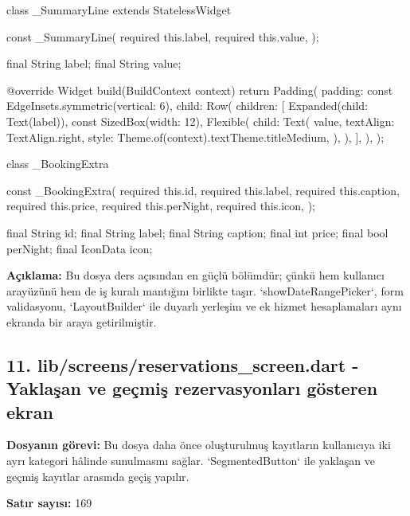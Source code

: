 \documentclass[11pt,a4paper]{article}
\begin{document}
\begin{codeblock}
class _SummaryLine extends StatelessWidget {
  const _SummaryLine({
    required this.label,
    required this.value,
  });

  final String label;
  final String value;

  @override
  Widget build(BuildContext context) {
    return Padding(
      padding: const EdgeInsets.symmetric(vertical: 6),
      child: Row(
        children: [
          Expanded(child: Text(label)),
          const SizedBox(width: 12),
          Flexible(
            child: Text(
              value,
              textAlign: TextAlign.right,
              style: Theme.of(context).textTheme.titleMedium,
            ),
          ),
        ],
      ),
    );
  }
}

class _BookingExtra {
  const _BookingExtra({
    required this.id,
    required this.label,
    required this.caption,
    required this.price,
    required this.perNight,
    required this.icon,
  });

  final String id;
  final String label;
  final String caption;
  final int price;
  final bool perNight;
  final IconData icon;
}
\end{codeblock}

\textbf{Açıklama:} Bu dosya ders açısından en güçlü bölümdür; çünkü hem kullanıcı arayüzünü hem de iş kuralı mantığını birlikte taşır. `showDateRangePicker`, form validasyonu, `LayoutBuilder` ile duyarlı yerleşim ve ek hizmet hesaplamaları aynı ekranda bir araya getirilmiştir.

\clearpage
\subsection{11. lib/screens/reservations\_screen.dart - Yaklaşan ve geçmiş rezervasyonları gösteren ekran}
\textbf{Dosyanın görevi:} Bu dosya daha önce oluşturulmuş kayıtların kullanıcıya iki ayrı kategori hâlinde sunulmasını sağlar. `SegmentedButton` ile yaklaşan ve geçmiş kayıtlar arasında geçiş yapılır.

\textbf{Satır sayısı:} 169
\end{document}
